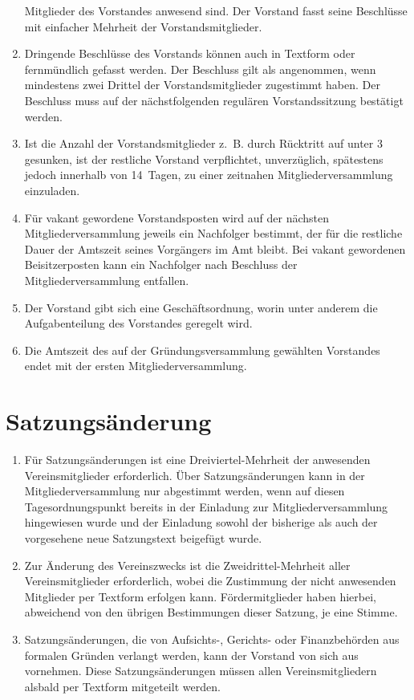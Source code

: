 \documentclass[a4paper,12pt]{scrartcl}
\begin{document}
\begin{enumerate}
    Mitglieder des Vorstandes anwesend sind. Der Vorstand fasst seine Beschlüsse
    mit einfacher Mehrheit der Vorstandsmitglieder.
  \item Dringende Beschlüsse des Vorstands können auch in Textform oder
    fernmündlich gefasst werden. Der Beschluss gilt als angenommen, wenn
    mindestens zwei Drittel der Vorstandsmitglieder zugestimmt haben. Der
    Beschluss muss auf der nächstfolgenden regulären Vorstandssitzung bestätigt
    werden.
  \item Ist die Anzahl der Vorstandsmitglieder z.~B. durch Rücktritt auf unter 3
    gesunken, ist der restliche Vorstand verpflichtet, unverzüglich, spätestens
    jedoch innerhalb von 14~Tagen, zu einer zeitnahen Mitgliederversammlung
    einzuladen.
  \item Für vakant gewordene Vorstandsposten wird auf der nächsten
    Mitgliederversammlung jeweils ein Nachfolger bestimmt, der für die restliche
    Dauer der Amtszeit seines Vorgängers im Amt bleibt. Bei vakant gewordenen
    Beisitzerposten kann ein Nachfolger nach Beschluss der Mitgliederversammlung
    entfallen.
  \item Der Vorstand gibt sich eine Geschäftsordnung, worin unter anderem die
    Aufgabenteilung des Vorstandes geregelt wird.
  \item Die Amtszeit des auf der Gründungsversammlung gewählten Vorstandes endet
    mit der ersten Mitgliederversammlung.
\end{enumerate}

\section{Satzungsänderung}
\begin{enumerate}
  \item Für Satzungsänderungen ist eine Dreiviertel-Mehrheit der anwesenden
    Vereinsmitglieder erforderlich. Über Satzungsänderungen kann in der
    Mitgliederversammlung nur abgestimmt werden, wenn auf diesen
    Tagesordnungspunkt bereits in der Einladung zur Mitgliederversammlung
    hingewiesen wurde und der Einladung sowohl der bisherige als auch der
    vorgesehene neue Satzungstext beigefügt wurde.
  \item Zur Änderung des Vereinszwecks ist die Zweidrittel-Mehrheit aller
    Vereinsmitglieder erforderlich, wobei die Zustimmung der nicht anwesenden
    Mitglieder per Textform erfolgen kann. Fördermitglieder haben hierbei,
    abweichend von den übrigen Bestimmungen dieser Satzung, je eine Stimme.
  \item Satzungsänderungen, die von Aufsichts-, Gerichts- oder Finanzbehörden
    aus formalen Gründen verlangt werden, kann der Vorstand von sich aus
    vornehmen. Diese Satzungsänderungen müssen allen Vereinsmitgliedern
    alsbald per Textform mitgeteilt werden.
\end{enumerate}
\end{document}
